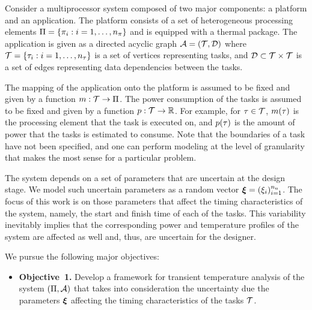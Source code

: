 Consider a multiprocessor system composed of two major components: a platform
and an application. The platform consists of a set of heterogeneous processing
elements $\Pi = \{ \pi_i: i = 1, \dots, {n_\pi} \}$ and is equipped with a
thermal package. The application is given as a directed acyclic graph $\mathcal{A} =
(\mathcal{T}, \mathcal{D})$ where $\mathcal{T} = \{ \tau_i: i = 1, \dots, {n_\tau} \}$ is a set of
vertices representing tasks, and $\mathcal{D} \subset \mathcal{T} \times \mathcal{T}$ is a set
of edges representing data dependencies between the tasks.

The mapping of the application onto the platform is assumed to be fixed and
given by a function $m: \mathcal{T} \to \Pi$. The power consumption of the
tasks is assumed to be fixed and given by a function $p: \mathcal{T} \to
\mathbb{R}$. For example, for $\tau \in \mathcal{T}$, $m(\tau)$ is the
processing element that the task is executed on, and $p(\tau)$ is the
amount of power that the tasks is estimated to consume. Note that the
boundaries of a task have not been specified, and one can perform modeling at
the level of granularity that makes the most sense for a particular problem.

The system depends on a set of parameters that are uncertain at the design
stage. We model such uncertain parameters as a random vector $\bm{\xi} = (\xi_i)_{i =
1}^{n_\text{u}}$. The focus of this work is on those parameters that affect the timing
characteristics of the system, namely, the start and finish time of each of the
tasks. This variability inevitably implies that the corresponding power and
temperature profiles of the system are affected as well and, thus, are uncertain
for the designer.

We pursue the following major objectives:
\begin{itemize}

  \item {\bfseries Objective~1.} Develop a framework for transient temperature
  analysis of the system $(\Pi, \mathcal{A})$ that takes into consideration the
  uncertainty due the parameters $\bm{\xi}$ affecting the timing characteristics of
  the tasks $\mathcal{T}$.

\end{itemize}
